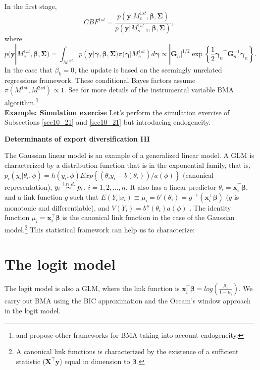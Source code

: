 In the first stage,
\begin{equation*}
	CBF^{1st}=\frac{p(\bm{y}|M_{c}^{1st},\bm{\beta},\bm{\Sigma})}{p(\bm{y}|M_{s-1}^{1st},\bm{\beta},\bm{\Sigma})},
\end{equation*}
where \begin{equation*}
	p(\bm{y}|M_{c}^{1st},\bm{\beta},\bm{\Sigma})=\int_{\mathcal{M}^{1st}}p(\bm{y}|\bm{\gamma},\bm{\beta},\bm{\Sigma})\pi(\bm{\gamma}|M_{c}^{1st})d\bm{\gamma}\propto |\bm{G}_n|^{1/2} \exp\left\{\frac{1}{2}{\bm{\gamma}_n}^{\top}\bm{G}_n^{-1}\bm{\gamma}_n\right\}.
\end{equation*}
In the case that $\beta_k=0$, the update is based on the seemingly unrelated regressions framework. These conditional Bayes factors assume $\pi(M^{1st},M^{2sd})\propto 1$. See \cite{Lenkoski2013} for more details of the instrumental variable BMA algorithm.\footnote{\cite{Koop12} and \cite{Lenkoski2014} propose other frameworks for BMA taking into account endogeneity.}\\

\textbf{Example: Simulation exercise}
Let's perform the simulation exercise of Subsections \ref{sec10_21} and \ref{sec10_21} but introducing endogeneity. 

\textbf{Determinants of export diversification III} 


The Gaussian linear model is an example of a generalized linear model.
A GLM is characterized by a distribution function that is in the exponential family, that is, $p_i(y_i|\theta_i,\phi)=h(y_i,\phi)Exp\left\{(\theta_iy_i-b(\theta_i))/a(\phi)\right\}$ (canonical representation), $y_i\stackrel{i.n.d.} {\thicksim}p_i$, $i=1,2,\dots,n$.
It also has a linear predictor $\theta_i=\bm{x}_i^{\top}\bm{\beta}$, and a link function $g$ such that $E(Y_i|x_i)\equiv \mu_i=b'(\theta_i)=g^{-1}(\bm{x}_i^{\top}\bm{\beta})$ ($g$ is monotonic and differentiable), and $V(Y_i)=b''(\theta_i)a(\phi)$ \cite{McCullagh1989}.
The identity function $\mu_i=\bm{x}_i^{\top}\bm{\beta}$ is the canonical link function in the case of the Gaussian model.\footnote{A canonical link functions is characterized by the existence of a sufficient statistic ($\bm{X}^{\top}\bm{y}$) equal in dimension to $\bm{\beta}$.} This statistical framework can help us to characterize:

\section{The logit model}\label{sec10_3}

The logit model is also a GLM, where the link function is $\bm{x}_i^{\top}\bm{\beta}=log\left(\frac{\mu_i}{1-\mu_i}\right)$.
We carry out BMA using the BIC approximation and the Occam's window approach in the logit model.

